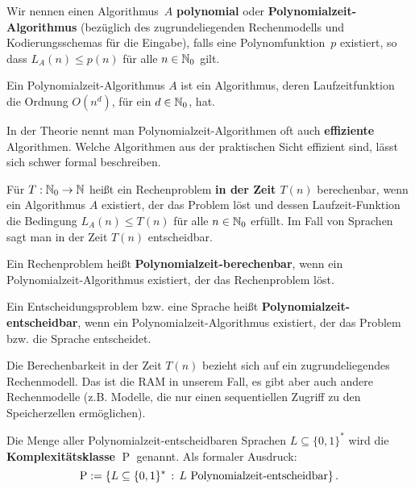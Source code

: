 \begin{defn} 
Wir nennen einen Algorithmus~$A$ \textbf{polynomial} oder \textbf{Polynomialzeit-Algorithmus} (bezüglich des zugrundeliegenden Rechenmodells und Kodierungsschemas für die Eingabe), falls eine Polynomfunktion~$p$ existiert, so dass $L_A(n) \leq p(n)$ für alle $n \in \mathbb{N}_0$ gilt.
\end{defn} 

\begin{bem}
	Ein Polynomialzeit-Algorithmus $A$ ist ein Algorithmus, deren Laufzeitfunktion die Ordnung $O(n^d)$, für ein $d \in \mathbb{N}_0$, hat. 
\end{bem} 

\begin{bem}
	In der Theorie nennt man Polynomialzeit-Algorithmen oft auch \textbf{effiziente} Algorithmen. Welche Algorithmen aus der praktischen Sicht effizient sind, lässt sich schwer formal beschreiben.
\end{bem} 

\begin{defn}
	Für $T: \mathbb{N}_0 \to \mathbb{N}$ heißt ein Rechenproblem \textbf{in der Zeit $T(n)$} berechenbar, wenn ein Algorithmus $A$ existiert, der das Problem löst und dessen Laufzeit-Funktion die Bedingung $L_A(n) \le T(n)$ für alle $n \in \mathbb{N}_0$ erfüllt. Im Fall von Sprachen sagt man \glqq in der Zeit $T(n)$ entscheidbar\grqq. 
	
	Ein Rechenproblem heißt \textbf{Polynomialzeit-berechenbar}, wenn ein Po\-ly\-no\-mi\-al\-zeit-Algorithmus existiert, der das Rechenproblem löst. 
	
	Ein Entscheidungsproblem bzw. eine Sprache heißt \textbf{Polynomialzeit-\-ent\-scheid\-bar}, wenn ein Polynomialzeit-Algorithmus existiert, der das Problem bzw. die Sprache entscheidet. 
\end{defn} 

\begin{bem}
	Die Berechenbarkeit in der Zeit $T(n)$ bezieht sich auf ein zugrundeliegendes Rechenmodell. Das ist die RAM in unserem Fall, es gibt aber auch andere Rechenmodelle (z.B. Modelle, die nur einen sequentiellen Zugriff zu den Speicherzellen ermöglichen). 
\end{bem} 

\begin{defn}
	Die Menge aller Polynomialzeit-entscheidbaren Sprachen $L \subseteq \{0,1\}^\ast$ wird die \textbf{Komplexitätsklasse} $\operatorname{P}$ genannt. Als formaler Ausdruck: 
	\[
			\DP := \setcond{L \subseteq \{0,1\}^\ast }{L \ \text{Polynomialzeit-entscheidbar} } .
	\]
\end{defn} 

